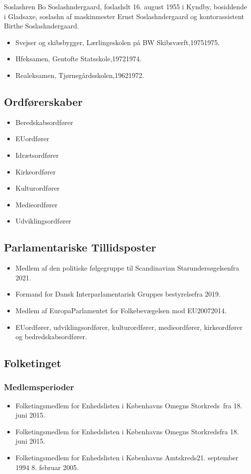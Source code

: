 \documentclass[11pt, a4paper]{awesome-cv}
\begin{document}
\makecvheader[R]
\makelettertitle
\begin{cvletter}
Soslashren Bo Soslashndergaard, foslashdt 16. august 1955 i Kyndby, bosiddende i Gladsaxe, soslashn af maskinmester Ernst Soslashndergaard og kontorassistent Birthe Soslashndergaard.

\begin{itemize}
\item Svejser og skibsbygger, Lærlingeskolen på BW Skibsværft,19751975.
\item Hfeksamen, Gentofte Statsskole,19721974.
\item Realeksamen, Tjørnegårdsskolen,19621972.
\end{itemize}
\subsection*{Ordførerskaber}
\begin{itemize}
\item Beredskabsordfører
\item EUordfører
\item Idrætsordfører
\item Kirkeordfører
\item Kulturordfører
\item Medieordfører
\item Udviklingsordfører
\end{itemize}
\subsection*{Parlamentariske Tillidsposter}
\begin{itemize}
\item Medlem af den politiske følgegruppe til Scandinavian Starundersøgelsenfra 2021.
\item Formand for Dansk Interparlamentarisk Gruppes bestyrelsefra 2019.
\item Medlem af EuropaParlamentet for Folkebevægelsen mod EU20072014.
\item EUordfører, udviklingsordfører, kulturordfører, medieordfører, kirkeordfører og bedredskabsordfører.
\end{itemize}
\subsection*{Folketinget}
\subsubsection*{Medlemsperioder}
\begin{itemize}
\item Folketingsmedlem for Enhedslisten i Københavns Omegns Storkreds fra 18. juni 2015.
\item Folketingsmedlem for Enhedslisten i Københavns Omegns Storkredsfra 18. juni 2015.
\item Folketingsmedlem for Enhedslisten i Københavns Amtskreds21. september 1994  8. februar 2005.
\end{itemize}

\end{cvletter}
\end{document}
